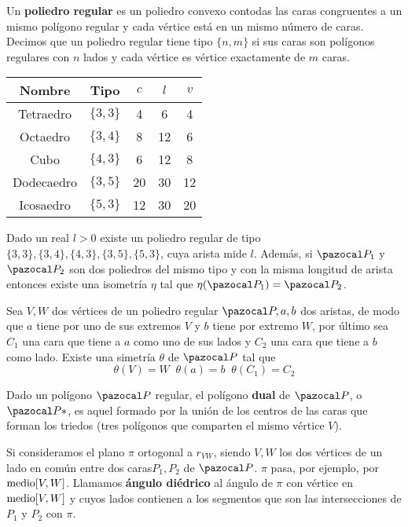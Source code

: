  Un \textbf{poliedro regular} es un poliedro convexo contodas las caras congruentes a un mismo polígono regular y cada vértice está en un mismo número de caras. Decimos que un poliedro regular tiene tipo $\{n, m\}$ si sus caras son polígonos regulares con $n$ lados y cada vértice es vértice exactamente de $m$ caras.

\begin{tabular}{ccccc}
	Nombre & Tipo & $c$ & $l$ & $v$ \\\midrule
	Tetraedro & $\{3,3\} $& 4 & 6 & 4 \\
	Octaedro & $\{3,4\}$ & 8 & 12 & 6 \\
	Cubo & $\{4,3\}$ & 6 & 12 & 8 \\
	Dodecaedro & $\{3,5\}$ & 20 & 30 & 12 \\
	Icosaedro & $\{5,3\}$ & 12 & 30 & 20 \\
\end{tabular}

 Dado un real $l>0$ existe un poliedro regular de tipo $\{3,3\},\{3,4\},\{4,3\},\{3,5\},\{5,3\}$, cuya arista mide $l$. Además, si $\PP_1$ y $\PP_2$ son dos poliedros del mismo tipo y con la misma longitud de arista entonces existe una isometría $\eta$ tal que $\eta(\PP_1) = \PP_2$.

 Sea $V, W$ dos vértices de un poliedro regular $\PP, a, b$ dos aristas, de modo que $a$ tiene por uno de sus extremos $V$ y $b$ tiene por extremo $W$, por último sea $C_1$ una cara que tiene a $a$ como uno de sus lados y $C_2$ una cara que tiene a $b$ como lado. Existe una simetría $\theta$ de $\PP$ tal que
\[\theta(V) = W \;\; \theta(a)=b \;\; \theta(C_1) = C_2  \]

 Dado un polígono $\PP$ regular, el polígono \textbf{dual} de $\PP$, o $\PP*$, es aquel formado por la unión de los centros de las caras que forman los triedos (tres polígonos que comparten el mismo vértice $V$).

 Si consideramos el plano $\pi$ ortogonal a $r_{VW}$, siendo $V,W$ los dos vértices de un lado en común entre dos caras$P_1, P_2$ de $\PP$. $\pi$ pasa, por ejemplo, por $\text{medio}[V,W]$. Llamamos \textbf{ángulo diédrico} al ángulo de $\pi$ con vértice en $\text{medio}[V,W]$ y cuyos lados contienen a los segmentos que son las intersecciones de $P_1$ y $P_2$ con $\pi$.

